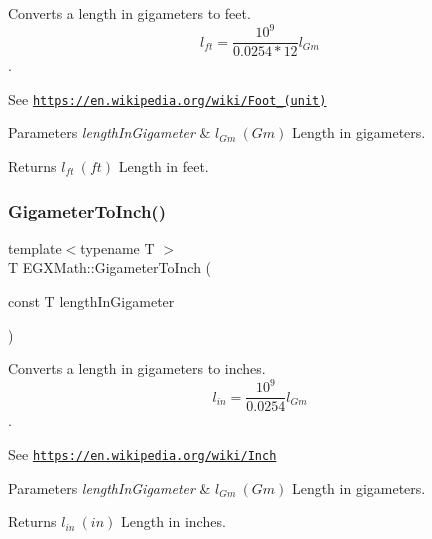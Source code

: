 Converts a length in gigameters to feet. \[ l_{ft}= \frac{10^{9}}{0.0254 * 12} l_{Gm} \]. 

See \href{https://en.wikipedia.org/wiki/Foot_(unit)}{\tt https\+://en.\+wikipedia.\+org/wiki/\+Foot\+\_\+(unit)} 
\begin{DoxyParams}{Parameters}
{\em length\+In\+Gigameter} & $ l_{Gm}\ (Gm)$ Length in gigameters. \\
\hline
\end{DoxyParams}
\begin{DoxyReturn}{Returns}
$ l_{ft}\ (ft)$ Length in feet. 
\end{DoxyReturn}
\mbox{\label{group___e_g_x_math-_conversions-_length_conversions-_gigameter-_imperial_gacff04b5343e94d6e31e601578d190fb8}} 
\subsubsection{\texorpdfstring{Gigameter\+To\+Inch()}{GigameterToInch()}}
{\footnotesize\ttfamily template$<$typename T $>$ \\
T E\+G\+X\+Math\+::\+Gigameter\+To\+Inch (\begin{DoxyParamCaption}\item[{const T}]{length\+In\+Gigameter }\end{DoxyParamCaption})}



Converts a length in gigameters to inches. \[ l_{in}= \frac{10^{9}}{0.0254} l_{Gm} \]. 

See \href{https://en.wikipedia.org/wiki/Inch}{\tt https\+://en.\+wikipedia.\+org/wiki/\+Inch} 
\begin{DoxyParams}{Parameters}
{\em length\+In\+Gigameter} & $ l_{Gm}\ (Gm)$ Length in gigameters. \\
\hline
\end{DoxyParams}
\begin{DoxyReturn}{Returns}
$ l_{in}\ (in)$ Length in inches. 
\end{DoxyReturn}
\mbox{\label{group___e_g_x_math-_conversions-_length_conversions-_gigameter-_imperial_ga498a43d44c0c0f6527362688d6cc361f}} 
